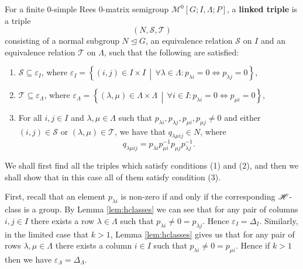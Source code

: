 \begin{definition}
  \label{def:linkedtriple}
  For a finite 0-simple Rees 0-matrix semigroup
  $\mathcal{M}^0[G;I,\Lambda;P]$, a \textbf{linked triple} is a
  triple $$(N,\mathcal{S},\mathcal{T})$$ consisting of a normal subgroup $N
  \trianglelefteq G$, an equivalence relation $\mathcal{S}$ on $I$ and an
  equivalence relation $\mathcal{T}$ on $\Lambda$, such that the following are
  satisfied:
  \begin{enumerate}
  \item $\mathcal{S} \subseteq \varepsilon_I$, where $\varepsilon_I =
    \left\{(i,j) \in I \times I\, \middle|\, \forall \lambda \in \Lambda:
      p_{\lambda i}=0 \iff p_{\lambda j}=0 \right\}$,
  \item $\mathcal{T} \subseteq \varepsilon_\Lambda$, where $\varepsilon_\Lambda
    = \left\{(\lambda,\mu) \in \Lambda \times \Lambda\, \middle|\, \forall i \in
      I: p_{\lambda i}=0 \iff p_{\mu i}=0 \right\}$,
  \item For all $i,j \in I$ and $\lambda, \mu \in \Lambda$ such that
    $p_{\lambda i}, p_{\lambda j}, p_{\mu i}, p_{\mu j} \neq 0$ and either
    $(i,j) \in \mathcal{S}$ or $(\lambda,\mu) \in \mathcal{T}$, we have
    that $q_{\lambda \mu i j} \in N$, where $$q_{\lambda \mu i j} = p_{\lambda
      i} p_{\mu i}^{-1} p_{\mu j} p_{\lambda j}^{-1}.$$
  \end{enumerate}
  \cite[p.86]{howie}
\end{definition}

We shall first find all the triples which satisfy conditions (1) and (2), and
then we shall show that in this case all of them satisfy condition (3).

First, recall that an element $p_{\lambda i}$ is non-zero if and only if the
corresponding $\mathrel{\mathscr{H}}$-class is a group.  By Lemma \ref{lem:hclasses} we can see that
for any pair of columns $i,j \in I$ there exists a row $\lambda \in \Lambda$
such that $p_{\lambda i} \neq 0 = p_{\lambda j}$.  Hence $\varepsilon_I =
\Delta_I$.  Similarly, in the limited case that $k>1$, Lemma \ref{lem:hclasses}
gives us that for any pair of rows $\lambda, \mu \in \Lambda$ there exists a
column $i \in I$ such that $p_{\lambda i} \neq 0 = p_{\mu i}$.  Hence if $k>1$
then we have $\varepsilon_\Lambda = \Delta_\Lambda$.

